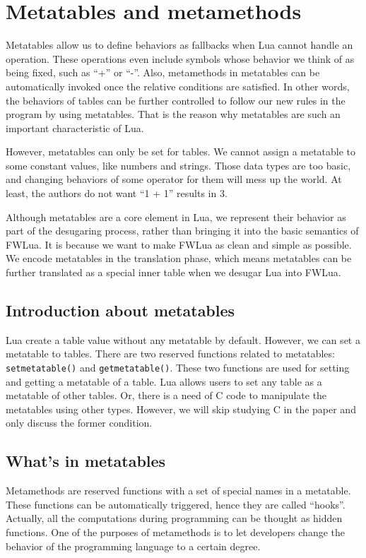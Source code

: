 \newcommand{\abFunction}[2]{{\tt function} ~{#1}~{\tt return}~{#2}~{\tt end}}
\newcommand{\semanticFullRaw}[4]{{#1},{#2} \Downarrow {#3},{#4}}
\newcommand{\semanticFull}[4]{{#1},{#2} \Downarrow {#3}, {#4}}


\section{Metatables and metamethods}
Metatables allow us to define behaviors as fallbacks when Lua cannot handle an operation. These operations even include symbols whose behavior we think of as being fixed, such as ``+'' or ``-''.
Also, metamethods in metatables can be automatically invoked once the relative conditions are satisfied. In other words, the behaviors of tables can be further controlled to follow our new rules in the program by using metatables. That is the reason why metatables are such an important characteristic of Lua.

However, metatables can only be set for tables. We cannot assign a metatable to some constant values, like numbers and strings. Those data types are too basic, and changing behaviors of some operator for them will mess up the world. At least, the authors do not want ``1 + 1'' results in 3. 

Although metatables are a core element in Lua, we represent their behavior as part of the desugaring process, rather than bringing it into the basic semantics of FWLua.
It is because we want to make FWLua as clean and simple as possible.
We encode metatables in the translation phase, which means metatables can be further translated as a special inner table when we desugar Lua into FWLua.

\subsection{Introduction about metatables}
Lua create a table value without any metatable by default.
However, we can set a metatable to tables.
There are two reserved functions related to metatables: {\tt setmetatable()} and {\tt getmetatable()}. These two functions are used for setting and getting a metatable of a table. 
Lua allows users to set any table as a metatable of other tables. Or, there is a need of C code to manipulate the metatables using other types. However, we will skip studying C in the paper and only discuss the former condition.

\subsection{What's in metatables}
Metamethods are reserved functions with a set of special names in a metatable. These functions can be automatically triggered, hence they are called ``hooks''. Actually, all the computations during programming can be thought as hidden functions. One of the purposes of metamethods is to let developers change the behavior of the programming language to a certain degree.

